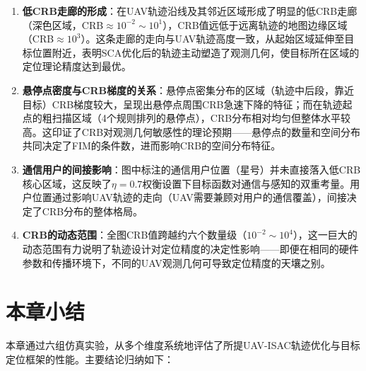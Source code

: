 \begin{enumerate}
\item \textbf{低CRB走廊的形成}：在UAV轨迹沿线及其邻近区域形成了明显的低CRB走廊（深色区域，CRB$\approx10^{-2}\sim10^{1}$），CRB值远低于远离轨迹的地图边缘区域（CRB$\approx10^{3}$）。这条走廊的走向与UAV轨迹高度一致，从起始区域延伸至目标位置附近，表明SCA优化后的轨迹主动塑造了观测几何，使目标所在区域的定位理论精度达到最优。

\item \textbf{悬停点密度与CRB梯度的关系}：悬停点密集分布的区域（轨迹中后段，靠近目标）CRB梯度较大，呈现出悬停点周围CRB急速下降的特征；而在轨迹起点的粗扫描区域（4个规则排列的悬停点），CRB分布相对均匀但整体水平较高。这印证了CRB对观测几何敏感性的理论预期——悬停点的数量和空间分布共同决定了FIM的条件数，进而影响CRB的空间分布特征。

\item \textbf{通信用户的间接影响}：图中标注的通信用户位置（星号）并未直接落入低CRB核心区域，这反映了$\eta=0.7$权衡设置下目标函数对通信与感知的双重考量。用户位置通过影响UAV轨迹的走向（UAV需要兼顾对用户的通信覆盖），间接决定了CRB分布的整体格局。

\item \textbf{CRB的动态范围}：全图CRB值跨越约六个数量级（$10^{-2}\sim10^{4}$），这一巨大的动态范围有力说明了轨迹设计对定位精度的决定性影响——即便在相同的硬件参数和传播环境下，不同的UAV观测几何可导致定位精度的天壤之别。
\end{enumerate}

\section{本章小结}

本章通过六组仿真实验，从多个维度系统地评估了所提UAV-ISAC轨迹优化与目标定位框架的性能。主要结论归纳如下：

